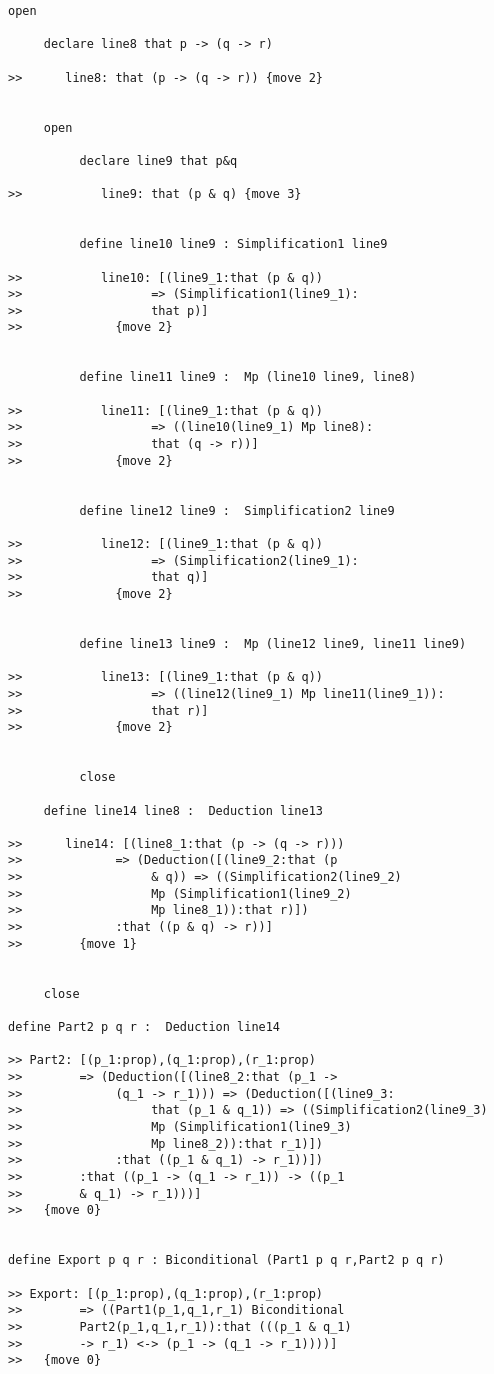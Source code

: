 \documentclass[12pt]{article}
\begin{document}
\begin{small}
\begin{verbatim}
open

     declare line8 that p -> (q -> r)

>>      line8: that (p -> (q -> r)) {move 2}


     open

          declare line9 that p&q

>>           line9: that (p & q) {move 3}


          define line10 line9 : Simplification1 line9

>>           line10: [(line9_1:that (p & q)) 
>>                  => (Simplification1(line9_1):
>>                  that p)]
>>             {move 2}


          define line11 line9 :  Mp (line10 line9, line8)

>>           line11: [(line9_1:that (p & q)) 
>>                  => ((line10(line9_1) Mp line8):
>>                  that (q -> r))]
>>             {move 2}


          define line12 line9 :  Simplification2 line9

>>           line12: [(line9_1:that (p & q)) 
>>                  => (Simplification2(line9_1):
>>                  that q)]
>>             {move 2}


          define line13 line9 :  Mp (line12 line9, line11 line9)

>>           line13: [(line9_1:that (p & q)) 
>>                  => ((line12(line9_1) Mp line11(line9_1)):
>>                  that r)]
>>             {move 2}


          close

     define line14 line8 :  Deduction line13

>>      line14: [(line8_1:that (p -> (q -> r))) 
>>             => (Deduction([(line9_2:that (p 
>>                  & q)) => ((Simplification2(line9_2) 
>>                  Mp (Simplification1(line9_2) 
>>                  Mp line8_1)):that r)])
>>             :that ((p & q) -> r))]
>>        {move 1}


     close

define Part2 p q r :  Deduction line14

>> Part2: [(p_1:prop),(q_1:prop),(r_1:prop) 
>>        => (Deduction([(line8_2:that (p_1 -> 
>>             (q_1 -> r_1))) => (Deduction([(line9_3:
>>                  that (p_1 & q_1)) => ((Simplification2(line9_3) 
>>                  Mp (Simplification1(line9_3) 
>>                  Mp line8_2)):that r_1)])
>>             :that ((p_1 & q_1) -> r_1))])
>>        :that ((p_1 -> (q_1 -> r_1)) -> ((p_1 
>>        & q_1) -> r_1)))]
>>   {move 0}


define Export p q r : Biconditional (Part1 p q r,Part2 p q r)

>> Export: [(p_1:prop),(q_1:prop),(r_1:prop) 
>>        => ((Part1(p_1,q_1,r_1) Biconditional 
>>        Part2(p_1,q_1,r_1)):that (((p_1 & q_1) 
>>        -> r_1) <-> (p_1 -> (q_1 -> r_1))))]
>>   {move 0}

\end{verbatim}

\end{small}
\end{document}
